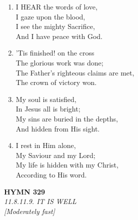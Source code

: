 \documentclass[11pt,a4paper]{article}
\begin{document}
\begin{enumerate}
    \item I HEAR the words of love, \\
        I gaze upon the blood, \\
        I see the mighty Sacrifice, \\
        And I have peace with God.

    \item 'Tis finished! on the cross \\
        The glorious work was done; \\
        The Father's righteous claims are met, \\
        The crown of victory won.

    \item My soul is satisfied, \\
        In Jesus all is bright; \\
        My sins are buried in the depths, \\
        And hidden from His sight.

    \item I rest in Him alone, \\
        My Saviour and my Lord; \\
        My life is hidden with my Christ, \\
        According to His word.

\end{enumerate}

\newpage
\begin{center}
    {\Large \textbf{HYMN 329}}
    \\
    \textit{11.8.11.9. IT IS WELL}
    \\
    \textit{\small [Moderately fast]}
\end{center}
\vspace{1em}
\end{document}

